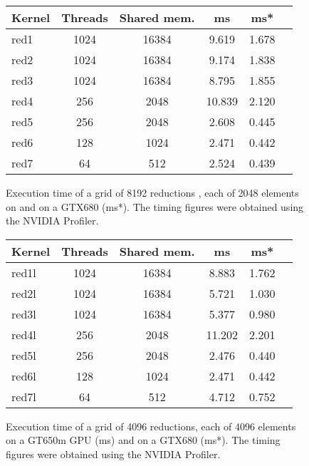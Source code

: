 \begin{figure} 
\begin{small}
\centering
\begin{tabular}{| l | c | c | c | c | r | }
\hline 
  Kernel & Threads & Shared mem. & ms & ms*\\ \hline 
  red1 & 1024 & 16384 & 9.619 & 1.678 \\ \hline
  red2 & 1024 & 16384 & 9.174 & 1.838 \\ \hline
  red3 & 1024 & 16384 & 8.795 & 1.855 \\ \hline
  red4 & 256 & 2048  & 10.839 & 2.120  \\ \hline
  red5 & 256 & 2048  & 2.608 &  0.445 \\ \hline
  red6 & 128 & 1024  & 2.471 &  0.442 \\ \hline
  red7 & 64 & 512  & 2.524 &    0.439 \\ \hline
\end{tabular}
\caption{ Execution time of a grid of 8192 reductions , each of
2048 elements on 
and on a GTX680 (ms*). The timing figures were obtained using the NVIDIA Profiler.}
\label{fig:reducetable} 
\end{small} 
\end{figure} 

\begin{figure} 
\begin{small}
\centering
\begin{tabular}{| l | c | c | c | c | r | }
\hline 
  Kernel & Threads & Shared mem. & ms & ms*\\ \hline 
  red1l & 1024 & 16384 & 8.883 & 1.762 \\ \hline
  red2l & 1024 & 16384 & 5.721 & 1.030  \\ \hline
  red3l & 1024 & 16384 & 5.377 & 0.980  \\ \hline
  red4l & 256 & 2048  & 11.202 & 2.201 \\ \hline
  red5l & 256 & 2048  & 2.476  & 0.440 \\ \hline
  red6l & 128 & 1024  & 2.471  & 0.442 \\ \hline
  red7l & 64 & 512  & 4.712    & 0.752\\ \hline
\end{tabular}
\caption{ Execution time of a grid of 4096 reductions, each of 4096 elements on a GT650m GPU (ms)
and on a GTX680 (ms*). The timing figures were obtained using the NVIDIA Profiler.}
\label{fig:reducetablel} 
\end{small} 
\end{figure} 





